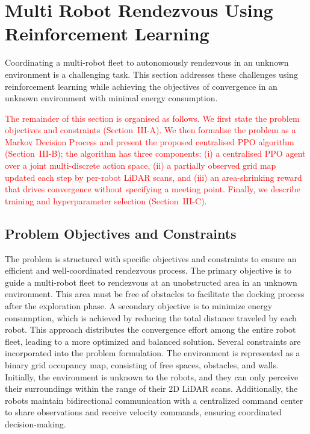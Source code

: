 \documentclass[journal]{IEEEtran}
\begin{document}
\section{Multi Robot Rendezvous Using Reinforcement Learning}

Coordinating a multi-robot fleet to autonomously rendezvous in an unknown environment is a challenging task. This section addresses these challenges using reinforcement learning while achieving the objectives of convergence in an unknown environment with minimal energy consumption.

\textcolor{red}{The remainder of this section is organised as follows. We first state the problem objectives and constraints (Section~III-A). We then formalise the problem as a Markov Decision Process and present the proposed centralised PPO algorithm (Section~III-B); the algorithm has three components: (i) a centralised PPO agent over a joint multi-discrete action space, (ii) a partially observed grid map updated each step by per-robot LiDAR scans, and (iii) an area-shrinking reward that drives convergence without specifying a meeting point. Finally, we describe training and hyperparameter selection (Section~III-C).}

\subsection{Problem Objectives and Constraints}

The problem is structured with specific objectives and constraints to ensure an efficient and well-coordinated rendezvous process. The primary objective is to guide a multi-robot fleet to rendezvous at an unobstructed area in an unknown environment. This area must be free of obstacles to facilitate the docking process after the exploration phase. A secondary objective is to minimize energy consumption, which is achieved by reducing the total distance traveled by each robot. This approach distributes the convergence effort among the entire robot fleet, leading to a more optimized and balanced solution. Several constraints are incorporated into the problem formulation. The environment is represented as a binary grid occupancy map, consisting of free spaces, obstacles, and walls. Initially, the environment is unknown to the robots, and they can only perceive their surroundings within the range of their 2D LiDAR scans. Additionally, the robots maintain bidirectional communication with a centralized command center to share observations and receive velocity commands, ensuring coordinated decision-making.
\end{document}
